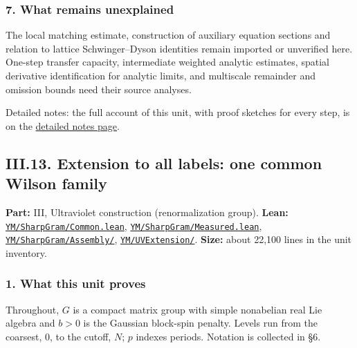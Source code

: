 \documentclass[
  letterpaper,
  11pt]{article}
\begin{document}
\subsubsection{7. What remains
unexplained}\label{what-remains-unexplained-14}

The local matching estimate, construction of auxiliary equation sections
and relation to lattice Schwinger--Dyson identities remain imported or
unverified here. One-step transfer capacity, intermediate weighted
analytic estimates, spatial derivative identification for analytic
limits, and multiscale remainder and omission bounds need their source
analyses.

Detailed notes: the full account of this unit, with proof sketches for
every step, is on the
\href{https://github.com/scottnarmstrong/yang-mills-informalization/blob/main/outline/notes/III-12.md}{detailed
notes page}.

\subsection{III.13. Extension to all labels: one common Wilson
family}\label{iii.13.-extension-to-all-labels-one-common-wilson-family}

\textbf{Part:} III, Ultraviolet construction (renormalization group).
\textbf{Lean:}
\href{https://github.com/yang-mills-group/OpenAI-YM-20261028/blob/3456e5e75cf8d4cd558955a5c7638fba2d68f464/YM/SharpGram/Common.lean}{\texttt{YM/SharpGram/Common.lean}},
\href{https://github.com/yang-mills-group/OpenAI-YM-20261028/blob/3456e5e75cf8d4cd558955a5c7638fba2d68f464/YM/SharpGram/Measured.lean}{\texttt{YM/SharpGram/Measured.lean}},
\href{https://github.com/yang-mills-group/OpenAI-YM-20261028/tree/3456e5e75cf8d4cd558955a5c7638fba2d68f464/YM/SharpGram/Assembly}{\texttt{YM/SharpGram/Assembly/}},
\href{https://github.com/yang-mills-group/OpenAI-YM-20261028/tree/3456e5e75cf8d4cd558955a5c7638fba2d68f464/YM/UVExtension}{\texttt{YM/UVExtension/}}.
\textbf{Size:} about 22,100 lines in the unit inventory.

\subsubsection{1. What this unit proves}\label{what-this-unit-proves-15}

Throughout, \(G\) is a compact matrix group with simple nonabelian real
Lie algebra and \(b>0\) is the Gaussian block-spin penalty. Levels run
from the coarsest, \(0\), to the cutoff, \(N\); \(p\) indexes periods.
Notation is collected in §6.
\end{document}
